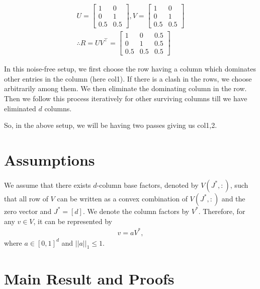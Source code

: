 \documentclass[twoside]{article}
\begin{document}
\begin{align*}
U = \begin{bmatrix}
    1 & 0 \\
    0 & 1 \\
    0.5 & 0.5
\end{bmatrix} , V= \begin{bmatrix}
    1 & 0 \\
    0 & 1 \\
    0.5 & 0.5
\end{bmatrix} \\
\therefore R = UV^{\intercal} = \begin{bmatrix}
    1 & 0 & 0.5\\
    0 & 1 & 0.5\\
    0.5 & 0.5 & 0.5
\end{bmatrix} 
\end{align*}

In this noise-free setup, we first choose the row having a column which dominates other entries in the column (here col{1}). If there is a clash  in the rows, we choose arbitrarily among them. We then eliminate the dominating column in the row. Then we follow this process iteratively for other surviving columns till we have eliminated $d$ columns. 

So, in the above setup, we will be having two passes giving us col{1,2}.



\section{Assumptions}

\begin{assumption}
\label{assm:1}
We assume that there exists $d$-column base factors, denoted by $V(J^*,:)$, such that all row of $V$ can be written as a convex combination of $V(J^*,:)$ and the zero vector and $J^* = [d]$. We denote the column factors by $V^*$. Therefore, for any $v\in V$, it can be represented by
\begin{align*}
v = aV^* , 
\end{align*}
where $a\in [0,1]^{d}$ and $ ||a||_1 \leq 1$.
\end{assumption}

\section{Main Result and Proofs}
\end{document}
